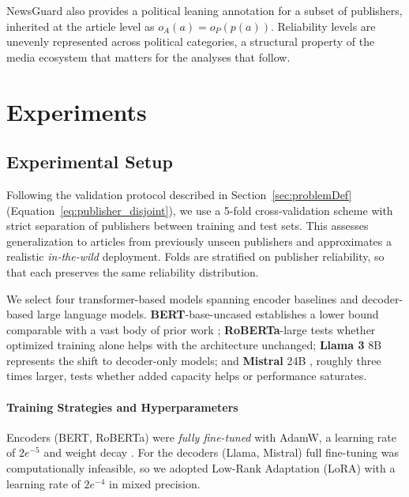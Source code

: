 \documentclass[runningheads]{llncs}
\begin{document}
NewsGuard also provides a political leaning annotation for a subset of publishers, inherited at the article level as \(o_A(a) = o_P(p(a))\). Reliability levels are unevenly represented across political categories, a structural property of the media ecosystem that matters for the analyses that follow.

\section{Experiments}


\subsection{Experimental Setup}
\label{sec:experimental_setup}

Following the validation protocol described in Section~\ref{sec:problemDef} (Equation~\ref{eq:publisher_disjoint}), we use a 5-fold cross-validation scheme with strict separation of publishers between training and test sets. This assesses generalization to articles from previously unseen publishers and approximates a realistic \textit{in-the-wild} deployment. Folds are stratified on publisher reliability, so that each preserves the same reliability distribution.

We select four transformer-based models spanning encoder baselines and decoder-based large language models. \textbf{BERT}-base-uncased \cite{devlin2019bert} establishes a lower bound comparable with a vast body of prior work \cite{rogers2021primer}; \textbf{RoBERTa}-large \cite{liu2019roberta} tests whether optimized training alone helps with the architecture unchanged; \textbf{Llama 3} 8B \cite{grattafiori2024llama} represents the shift to decoder-only models; and \textbf{Mistral} 24B \cite{mistralsmall3}, roughly three times larger, tests whether added capacity helps or performance saturates.

\paragraph{Training Strategies and Hyperparameters} Encoders (BERT, RoBERTa) were \textit{fully fine-tuned} with AdamW, a learning rate of $2e^{-5}$ and weight decay \cite{devlin2019bert,liu2019roberta}. For the decoders (Llama, Mistral) full fine-tuning was computationally infeasible, so we adopted Low-Rank Adaptation (LoRA) with a learning rate of $2e^{-4}$ in mixed precision.
\end{document}
